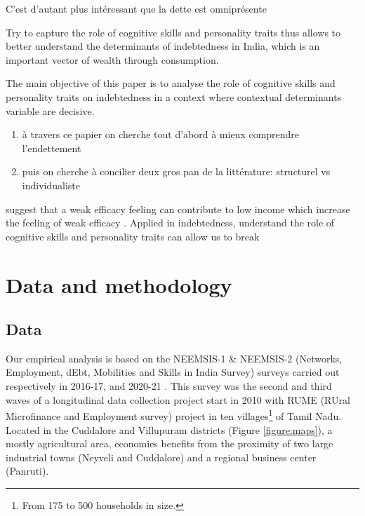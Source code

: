 \documentclass[a4paper, 11pt, onecolumn]{article}
\begin{document}
C'est d'autant plus intéressant que la dette est omniprésente \cite{Guerin2013}

Try to capture the role of cognitive skills and personality traits thus allows to better understand the determinants of indebtedness in India, which is an important vector of wealth through consumption. 



The main objective of this paper is to analyse the role of cognitive skills and personality traits on indebtedness in a context where contextual determinants variable are decisive.
\begin{enumerate}
\item à travers ce papier on cherche tout d'abord à mieux comprendre l'endettement 
\item puis on cherche à concilier deux gros pan de la littérature: structurel vs individualiste
\end{enumerate}


\cite{Fong2001} suggest that a weak efficacy feeling can contribute to low income which increase the feeling of weak efficacy \citep{Bowles2001}. 
Applied in indebtedness, understand the role of cognitive skills and personality traits can allow us to break 








\newpage
\section{Data and methodology}


	\subsection{Data}

Our empirical analysis is based on the NEEMSIS-1 \& NEEMSIS-2 (Networks, Employment, dEbt, Mobilities and Skills in India Survey) surveys carried out respectively in 2016-17, and 2020-21 \citep{NEEMSISreport, NEEMSIS2017}.
This survey was the second and third waves of a longitudinal data collection project start in 2010 with RUME (RUral Microfinance and Employment survey) project in ten villages\footnote{From 175 to 500 households in size.} of Tamil Nadu.
Located in the Cuddalore and Villupuram districts (Figure \ref{figure:maps}), a mostly agricultural area, economies benefits from the proximity of two large industrial towns (Neyveli and Cuddalore) and a regional business center (Panruti).
\end{document}
